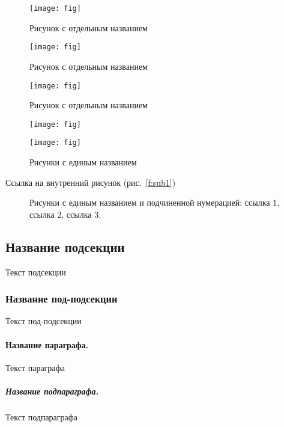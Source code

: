 \begin{figure}[!ht]
\centering
  \begin{minipage}{5cm}
    \centering
    \texttt{[image: fig]}
    \caption{Рисунок с отдельным названием}
  \end{minipage}
  \quad
  \begin{minipage}{5cm}
    \centering
    \texttt{[image: fig]}
    \caption{Рисунок с отдельным названием}
  \end{minipage}
  \quad
  \begin{minipage}{5cm}
    \centering
    \texttt{[image: fig]}
    \caption{Рисунок с отдельным названием}
  \end{minipage}
\end{figure}

\begin{figure}[!ht]
\centering
  \begin{minipage}{5cm}
    \centering
    \texttt{[image: fig]}
  \end{minipage}
  \quad
  \begin{minipage}{5cm}
    \centering
    \texttt{[image: fig]}
  \end{minipage}
  \caption{Рисунки с единым названием}
\end{figure}

Ссылка на внутренний рисунок (рис.~\ref{f:sub1})

\begin{figure}[!ht]
\centering
  \quad
  \quad
\caption[]{%
Рисунки с единым названием и подчиненной нумерацией:
   ссылка 1,
   ссылка 2,
   ссылка 3.
}
\end{figure}

\subsection{Название подсекции}
Текст подсекции
\subsubsection{Название под-подсекции}
Текст под-подсекции
\paragraph{Название параграфа.}
Текст параграфа
\subparagraph{Название подпараграфа.}
Текст подпараграфа

